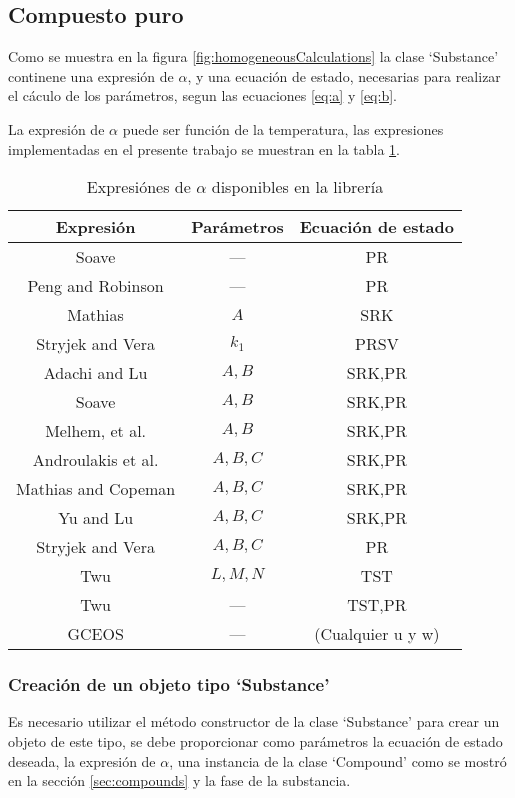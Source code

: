 \subsection{Compuesto puro}\label{subsec:substance}

Como se muestra en la figura \ref{fig:homogeneousCalculations} la clase `Substance' continene una expresión de $\alpha$, y una ecuación de estado, necesarias para realizar el cáculo de los parámetros, segun las ecuaciones \ref{eq:a} y \ref{eq:b}. 

La expresión de $\alpha$ puede ser función de la temperatura, las expresiones implementadas en el presente trabajo se muestran en la tabla \ref{tab:alphas}.

\begin{table}[!h]
	\centering
	\caption{Expresiónes de $\alpha$ disponibles en la librería}\label{tab:alphas}
	\begin{tabular}{|c|c|c| }
		\hline
		Expresión & Parámetros & Ecuación de estado\\
		\hline
		Soave    &  ---& PR\\
		Peng and Robinson & ---& PR \\
		Mathias & $A$ & SRK\\
		Stryjek and Vera & $k_1$ & PRSV\\
		Adachi and Lu & $A,B$&SRK,PR\\
		Soave & $A,B$&SRK,PR\\
		Melhem, et al. & $A,B$&SRK,PR\\
		Androulakis et al. & $A,B,C$& SRK,PR\\
		Mathias and Copeman & $A,B,C$& SRK,PR\\
		Yu and Lu & $A,B,C$&SRK,PR\\
		Stryjek and Vera & $A,B,C$&PR\\
		Twu & $L,M,N$&TST\\
		Twu & ---&TST,PR\\
		GCEOS & ---& (Cualquier u y w)\\
		\hline
	\end{tabular}
\end{table}
\subsubsection{Creación de un objeto tipo `Substance'}\label{subsub:substanceCreation}

Es necesario utilizar el método constructor de la clase `Substance' para crear un objeto de este tipo, se debe proporcionar como parámetros la ecuación de estado deseada, la expresión de $\alpha$, una instancia de la clase `Compound' como se mostró en la sección \ref{sec:compounds} y la fase de la substancia.

